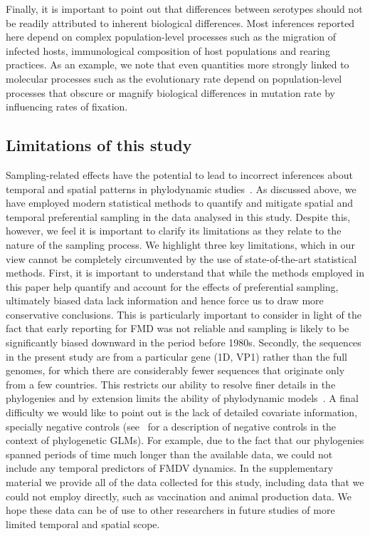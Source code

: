 \documentclass[10pt]{article}
\begin{document}
Finally, it is important to point out that differences between serotypes should not be readily attributed to inherent biological differences.
Most inferences reported here depend on complex population-level processes such as the migration of infected hosts, immunological composition of host populations and rearing practices.
As an example, we note that even quantities more strongly linked to molecular processes such as the evolutionary rate depend on population-level processes that obscure or magnify biological differences in mutation rate by influencing rates of fixation.

\subsection*{Limitations of this study}

Sampling-related effects have the potential to lead to incorrect inferences about temporal and spatial patterns in phylodynamic studies~\citep{Hall2016,Dearlove2017}.
As discussed above, we have employed modern statistical methods to quantify and mitigate spatial and temporal preferential sampling in the data analysed in this study.
Despite this, however, we feel it is important to clarify its limitations as they relate to the nature of the sampling process.
We highlight three key limitations, which in our view cannot be completely circumvented by the use of state-of-the-art statistical methods. 
First, it is important to understand that while the methods employed in this paper help quantify and account for the effects of preferential sampling, ultimately biased data lack information and hence force us to draw more conservative conclusions.
This is particularly important to consider in light of the fact that early reporting for FMD was not reliable and sampling is likely to be significantly biased downward in the period before 1980s.
Secondly, the sequences in the present study are from a particular gene (1D, VP1) rather than the full genomes, for which there are considerably fewer sequences that originate only from a few countries.
This restricts our ability to resolve finer details in the phylogenies and by extension limits the ability of phylodynamic models~\citep{Valdazo2012,Dudas2019}.
A final difficulty we would like to point out is the lack of detailed covariate information, specially negative controls (see~\cite{Dellicour2018} for a description of negative controls in the context of phylogenetic GLMs).
For example, due to the fact that our phylogenies spanned periods of time much longer than the available data, we could not include any temporal predictors of FMDV dynamics. %
In the supplementary material we provide all of the data collected for this study, including data that we could not employ directly, such as vaccination and animal production data.
We hope these data can be of use to other researchers in future studies of more limited temporal and spatial scope.
\end{document}
